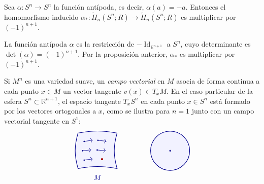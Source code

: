 \begin{corolario}
Sea $\alpha \colon S^n \to S^n$ la función antípoda, es decir, $\alpha(a) = -a$. Entonces el homomorfismo inducido $\alpha_* \colon \widetilde{H}_n(S^n; R) \to \widetilde{H}_n(S^n; R)$ es multiplicar por $(-1)^{n+1}$.
\end{corolario}

\begin{dem}
La función antípoda $\alpha$ es la restricción de $-\operatorname{Id}_{\mathbb{R}^{n+1}}$ a $S^n$, cuyo determinante es $\det(\alpha) = (-1)^{n+1}$. Por la proposición anterior, $\alpha_*$ es multiplicar por $(-1)^{n+1}$.
\end{dem}

\begin{nota}
Si $M^n$ es una variedad suave, un \textit{campo vectorial} en $M$ asocia de forma continua a cada punto $x \in M$ un vector tangente $v(x) \in T_x M$. En el caso particular de la esfera $S^n \subset \mathbb{R}^{n+1}$, el espacio tangente $T_x S^n$ en cada punto $x \in S^n$ está formado por los vectores ortogonales a $x$, como se ilustra para $n = 1$ junto con un campo vectorial tangente en $S^1$:
\[
\begin{tikzpicture}[baseline=(current bounding box.center), scale=0.92]
    \begin{scope}
        \filldraw[thick, blue!55!black, fill=blue!5]
            (-0.95,  0.95) to[bend right=16] (-0.95, -0.95)
                           to[bend left=10]  ( 1.15, -0.95)
                           to[bend left=16]  ( 1.15,  0.95)
                           to[bend right=10] (-0.95,  0.95) -- cycle;

        \foreach \x/\y/\dx/\dy in {
            -0.62/ 0.50/0.46/ 0.07,
             0.12/ 0.56/0.46/-0.05,
            -0.70/ 0.00/0.46/ 0.05,
             0.08/ 0.04/0.46/-0.04,
            -0.62/-0.50/0.46/ 0.06
        }{
            \fill[blue!55!black] (\x, \y) circle (1.1pt);
            \draw[->, semithick, blue!55!black] (\x, \y) -- ++(\dx, \dy);
        }

        \fill[red!65!black] (0.34, -0.45) circle (1.6pt);
        \node[blue!55!black] at (0.10, -1.42) {$M$};
    \end{scope}

    \begin{scope}[xshift=4.0cm]
        \filldraw[thick, blue!55!black, fill=blue!5] (0, 0) circle (1.05);
        \fill[blue!55!black] (0, 0) circle (1.2pt);


\end{scope}
\end{tikzpicture}\]
\end{nota}
